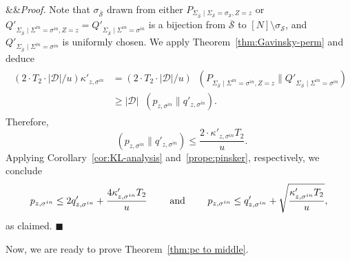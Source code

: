 \documentclass[11pt]{article}
\renewenvironment{proof}[1][]
    {\noindent
       \ifx&#1&{\it Proof.}
       \else{\it Proof ({#1}).}
       \fi}{\hfill $\blacksquare$}
\DeclareMathOperator{\KL}{D_{\text{KL}}}
\newcommand{\SECS}{{\mathcal{D}}}
\begin{document}
\begin{proof}
Note that $\sigma_{\overline{\mathcal{S}}}$ drawn from either 
$P_{ \Sigma_{\overline{\mathcal{S}}} \mid \Sigma_{\mathcal{S}} = \sigma_{\mathcal{S}}, Z = z}$
or 
$
Q'_{ \Sigma_{\overline{\mathcal{S}}} \mid \Sigma^{in} = \sigma^{in}, Z = z} =
Q'_{ \Sigma_{\overline{\mathcal{S}}} \mid \Sigma^{in} = \sigma^{in} }$
is a bijection from $\overline{\mathcal{S}}$ to $[N] \setminus \sigma_{\mathcal{S}}$,
and 
$Q'_{ \Sigma_{\overline{\mathcal{S}}} \mid \Sigma^{in} = \sigma^{in} }$
is uniformly chosen.
%
We apply Theorem~\ref{thm:Gavinsky-perm} and deduce  
\begin{align*}
\begin{split}
(2 \cdot T_2 \cdot |\SECS|/u) \kappa'_{z, \sigma^{in} }  
&= 
(2 \cdot T_2 \cdot |\SECS|/u)  \KL( P_{ \Sigma_{\overline{\mathcal{S}}} \mid \Sigma^{in} = \sigma^{in}, Z = z} \| Q'_{ \Sigma_{ \overline{\mathcal{S}} } \mid \Sigma^{in} = \sigma^{in} } )  \\
&\geq 
|\SECS|
\KL( p_{z, \sigma^{in} } \| 
     q'_{z,\sigma^{in} } ).
\end{split}
\end{align*}
%
Therefore,
$$\KL( p_{z,\sigma^{in}} \| 
     q'_{z,\sigma^{in} } ) \leq \frac{2 \cdot \kappa'_{z, \sigma^{in} } T_2}{u}.$$
Applying Corollary~\ref{cor:KL-analysis} and~\ref{prope:pinsker}, respectively, we conclude 
$$p_{z,\sigma^{in} } \leq 2 q'_{z,\sigma^{in} } + \frac{4 \kappa'_{z,  \sigma^{in} } T_2 }{u} \qquad
\textup{ and } \qquad 
p_{z,\sigma^{in} } \leq q'_{z,\sigma^{in} } + \sqrt{\frac{\kappa'_{z,  \sigma^{in} } T_2} {{u}}},
$$
as claimed.
\end{proof}

\medskip Now, we are ready to prove Theorem~\ref{thm:pc to middle}.
\end{document}

